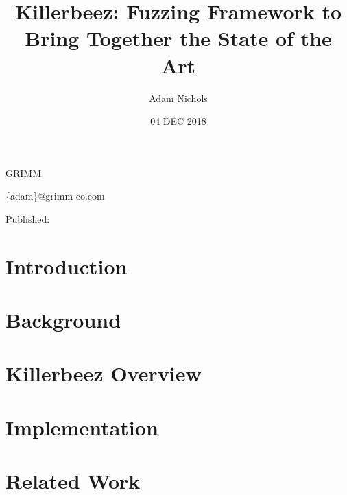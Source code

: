 \documentclass{article}
\title{Killerbeez: Fuzzing Framework to Bring Together the State of the Art}
\author{Adam Nichols}
\date{04 DEC 2018}
\begin{document}
\makeatletter
\centerline{\Large{\textbf{\@title}}}

\centerline{\@author}

\centerline{GRIMM}

\centerline{\{adam\}@grimm-co.com}

\centerline{Published: \@date}
\makeatother


\begin{multicols}{2}

\section{Introduction} \label{Introduction}


\section{Background} \label{Background}


\section{Killerbeez Overview} \label{Killerbeez Overview}


\section{Implementation} \label{Implementation}




\section{Related Work} \label{Related Work}



\end{multicols}
\end{document}
